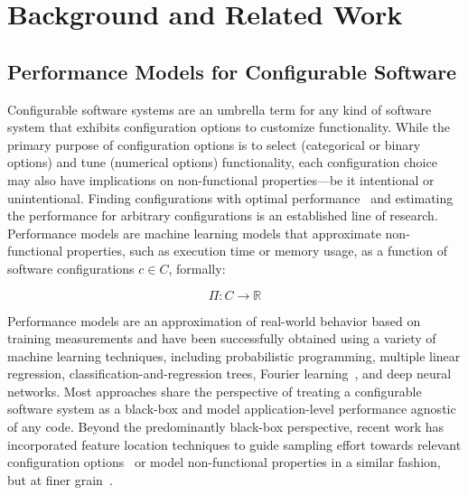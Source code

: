 \section{Background and Related Work}
\subsection{Performance Models for Configurable Software}
Configurable software systems are an umbrella term for any kind of software system that exhibits configuration options to customize functionality. 
While the primary purpose of configuration options is to select (categorical or binary options) and tune (numerical options) functionality, each configuration choice may also have implications on non-functional properties---be it intentional or unintentional. Finding configurations with optimal performance~\cite{nairUsingBadLearners2017,nairFlash18,ohFindingNearoptimalConfigurations2017} and estimating the performance for arbitrary configurations is an established line of research\cite{siegmundPerformanceinfluenceModelsHighly2015,haDeepPerf2019,perfAL,guoVariabilityawarePerformancePrediction2013,sarkarCostEfficientSamplingPerformance,guo_2018_data,fourier_learning_2015,perLasso}. 
Performance models are machine learning models that approximate non-functional properties, such as execution time or memory usage, as a function of software configurations $c \in C$, formally:

\begin{equation}
	\Pi: C \rightarrow \mathbb{R}
\end{equation}

Performance models are an approximation of real-world behavior based on training measurements and have been successfully obtained using a variety of machine learning techniques, including probabilistic programming\cite{dorn2020}, multiple linear regression\cite{siegmundPerformanceinfluenceModelsHighly2015}, classification-and-regression trees\cite{sarkarCostEfficientSamplingPerformance,guo_2018_data}, Fourier learning~\cite{fourier_learning_2015,perLasso}, and deep neural networks\cite{haDeepPerf2019,perfAL}. Most approaches share the perspective of treating a configurable software system as a black-box and model application-level performance agnostic of any code. 
Beyond the predominantly black-box perspective, recent work has incorporated feature location techniques to guide sampling effort towards relevant configuration options~\cite{velez_2020_configcrusher_jase,velez_comprex_2021} or model non-functional properties in a similar fashion, but at finer grain~\cite{weber_white_2021}.

